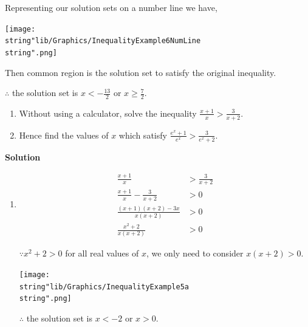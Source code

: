 \documentclass[11pt,a4paper]{book}
\begin{document}
\begin{example}{}
Representing our solution sets on a number line we have,
\begin{center}
\texttt{[image: \\string"lib/Graphics/InequalityExample6NumLine\\string".png]}
\par\end{center}

Then common region is the solution set to satisfy the original inequality.

$\therefore$ the solution set is ${\displaystyle x<-\frac{13}{2}}$
or ${\displaystyle x\geq\frac{7}{2}}$.
\end{example}

\begin{example}{}
\begin{enumerate}[label=(\alph*)]

\item Without using a calculator, solve the inequality ${\displaystyle \frac{x+1}{x}>\frac{3}{x+2}}$.

\item Hence find the values of $x$ which satisfy ${\displaystyle \frac{e^{x}+1}{e^{x}}>\frac{3}{e^{x}+2}}$.

\end{enumerate}

\textbf{\large{}Solution}{\large\par}

\begin{enumerate}[label=(\alph*)]

\item
\begin{align*}
{\displaystyle \frac{x+1}{x}} & >\frac{3}{x+2}\tag{1}\\
{\displaystyle \frac{x+1}{x}}-\frac{3}{x+2} & >0\\
\frac{\left(x+1\right)\left(x+2\right)-3x}{x\left(x+2\right)} & >0\\
\frac{x^{2}+2}{x\left(x+2\right)} & >0
\end{align*}

$\because x^{2}+2>0$ for all real values of $x$, we only need to
consider $x\left(x+2\right)>0$.
\begin{center}
\texttt{[image: \\string"lib/Graphics/InequalityExample5a\\string".png]}
\par\end{center}

$\therefore$ the solution set is $x<-2$ or $x>0$.


\end{enumerate}
\end{example}
\end{document}
